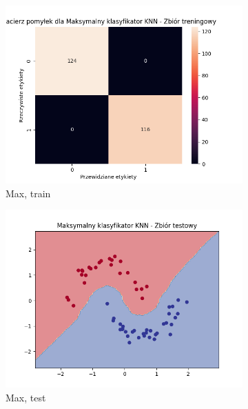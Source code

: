 \documentclass[12pt]{article}
\newcommand*{\subfigwidth}{0.15\textwidth}
\begin{document}
\begin{figure}[H]
\begin{subfigure}[t]{\subfigwidth}
        \includegraphics[width=\linewidth]{img/exp_2/knn/2_2/max/train_matrix.png}
        \caption{Max, train}
    \end{subfigure}
    \hfill
    \begin{subfigure}[t]{\subfigwidth}
        \includegraphics[width=\linewidth]{img/exp_2/knn/2_2/max/test_boundary.png}
        \caption{Max, test}
    \end{subfigure}
    \hfill
    \begin{subfigure}[t]{\subfigwidth}

\end{subfigure}
\end{figure}
\end{document}
